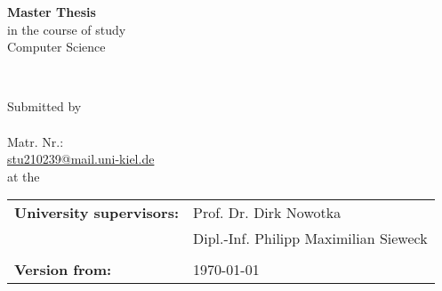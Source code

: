 
\begin{titlepage}

    
    
    
    
    \center
    \LARGE
    \vspace*{0.5cm}
    \textbf{Master Thesis}\\[0.5cm]
    \large
    in the course of study\\
    
    Computer Science\\
    \vfill
    
    
    
    \begin{spacing}{2}
        {\huge \bfseries \textbf{\myThesis{}}}\\
    \end{spacing}
    \vfill
    
    
    
    
    Submitted by\\[0.5cm]
    
    \textbf{\myName{}}\\
    Matr. Nr.: \myStudentID{} \\
    \href{mailto:stu210239@mail.uni-kiel.de}{stu210239@mail.uni-kiel.de}\\[0.5cm]
    
    at the \myHochschule{} \\
    
    \vfill
    
    \begin{tabular}{ll}
        \textbf{University supervisors:} & Prof. Dr. Dirk Nowotka                \\
                                         & Dipl.-Inf. Philipp Maximilian Sieweck \\
                                         &                                       \\
        \textbf{Version from: }          & \today                                \\
    \end{tabular}
    
    \vfill
    
\end{titlepage}